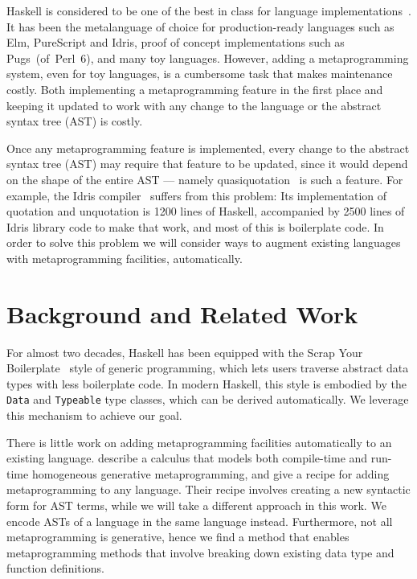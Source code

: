 \documentclass[format=acmsmall, review=false, screen=true]{acmart}
\newcommand{\CodeType}[1]{\textcolor{CodeBlue}{#1}}
\newcommand{\ty}[1]{\CodeType{\texttt{#1}}}
\begin{document}
Haskell is considered to be one of the best in class for language implementations~\cite{sotu}.
It has been the metalanguage of choice for production-ready languages such as Elm, PureScript and Idris, proof of concept implementations such as \mbox{Pugs (of Perl 6)}, and many toy languages.
However, adding a metaprogramming system, even for toy languages, is a cumbersome task that makes maintenance costly.
Both implementing a metaprogramming feature in the first place and keeping it updated to work with any change to the language or the abstract syntax tree (AST) is costly.

Once any metaprogramming feature is implemented, every change to the abstract syntax tree (AST) may require that feature to be updated, since it would depend on the shape of the entire AST --- namely quasiquotation~\cite{idrisQuotation} is such a feature.
For example, the Idris compiler~\cite{idris} suffers from this problem: Its implementation of quotation and unquotation is 1200 lines of Haskell, accompanied by 2500 lines of Idris library code to make that work, and most of this is boilerplate code. In order to solve this problem we will consider ways to augment existing languages with metaprogramming facilities, automatically.

\section{Background and Related Work}

For almost two decades, Haskell has been equipped with the Scrap Your
Boilerplate~\cite{syb,sybc} style of generic programming, which lets users traverse
abstract data types with less boilerplate code.
In modern Haskell, this style is embodied by the \ty{Data} and \ty{Typeable}
type classes, which can be derived automatically.
We leverage this mechanism to achieve our goal.

There is little work on adding metaprogramming facilities automatically to an existing language.
\citet{hgmp} describe a calculus that models both compile-time and run-time homogeneous generative metaprogramming, and give a recipe for adding metaprogramming to any language.
Their recipe involves creating a new syntactic form for AST terms, while we
will take a different approach in this work.
We encode ASTs of a language in the same language instead.
Furthermore, not all metaprogramming is generative, hence we find a method that enables metaprogramming methods that involve breaking down existing data type and function definitions.
\end{document}
